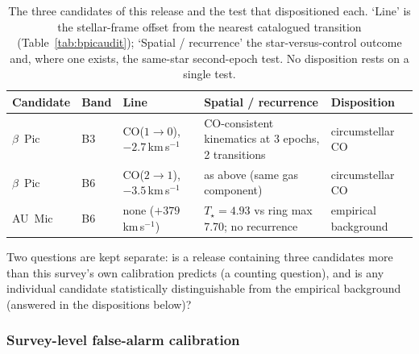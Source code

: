 \documentclass{openjournal}
\begin{document}
\begin{table}
\centering
\small
\setlength{\tabcolsep}{4pt}
\caption{The three candidates of this release and the test that
dispositioned each. `Line' is the stellar-frame offset from the
nearest catalogued transition (Table~\ref{tab:bpicaudit}); `Spatial /
recurrence' the star-versus-control outcome and, where one exists,
the same-star second-epoch test. No disposition rests on a single
test.}
\label{tab:candidates}
\begin{tabular}{@{}lllll@{}}
\toprule
Candidate & Band & Line & Spatial / recurrence & Disposition \\
\midrule
$\beta$~Pic & B3 & CO($1{\to}0$), $-2.7$\,km\,s$^{-1}$ & CO-consistent kinematics at 3 epochs, 2 transitions & circumstellar CO \\
$\beta$~Pic & B6 & CO($2{\to}1$), $-3.5$\,km\,s$^{-1}$ & as above (same gas component) & circumstellar CO \\
AU~Mic & B6 & none ($+379$\,km\,s$^{-1}$) & $T_\star=4.93$ vs ring max 7.70; no recurrence & empirical background \\
\bottomrule
\end{tabular}
\end{table}

Two questions are kept separate: is a release containing three
candidates more than this survey's own calibration predicts (a
counting question), and is any individual candidate statistically
distinguishable from the empirical background (answered in the
dispositions below)?

\subsubsection*{Survey-level false-alarm calibration}
\end{document}
